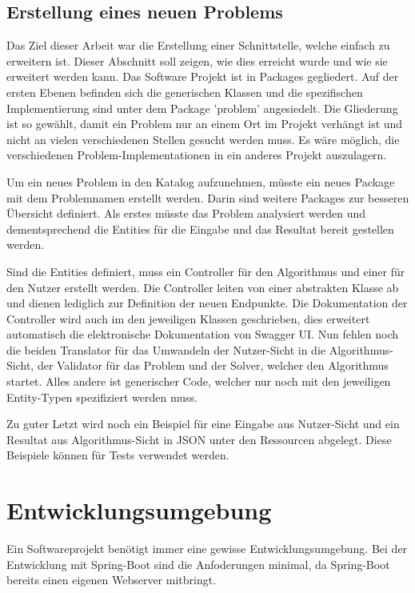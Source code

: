 \FloatBarrier

\subsection{Erstellung eines neuen Problems}
Das Ziel dieser Arbeit war die Erstellung einer Schnittstelle, welche einfach zu erweitern ist. Dieser Abschnitt soll zeigen, wie dies erreicht wurde und wie sie erweitert werden kann. Das 
Software Projekt ist in Packages gegliedert. Auf der ersten Ebenen befinden sich die generischen Klassen und die spezifischen Implementierung sind unter dem Package 'problem'  angesiedelt. 
Die Gliederung ist so gewählt, damit ein Problem nur an einem Ort im Projekt verhängt ist und nicht an vielen verschiedenen Stellen gesucht werden muss. Es wäre möglich, 
die verschiedenen Problem-Implementationen in ein anderes Projekt auszulagern.

Um ein neues Problem in den Katalog aufzunehmen, 
müsste ein neues Package mit dem Problemnamen erstellt werden. Darin sind weitere Packages zur besseren Übersicht definiert. Als erstes müsste das Problem analysiert werden und 
dementsprechend die Entities für die Eingabe und das Resultat bereit gestellen werden.

Sind die Entities definiert, muss ein Controller für den Algorithmus und einer für den Nutzer erstellt werden. Die Controller leiten von einer abstrakten Klasse ab und dienen lediglich zur Definition
der neuen Endpunkte. Die Dokumentation der Controller wird auch im den jeweiligen Klassen geschrieben, dies erweitert automatisch die elektronische Dokumentation von Swagger UI. 
Nun fehlen noch die beiden Translator für das Umwandeln der Nutzer-Sicht in die Algorithmus-Sicht, der Validator für das Problem und der Solver, welcher den Algorithmus 
startet. Alles andere ist generischer Code, welcher nur noch mit den jeweiligen Entity-Typen spezifiziert werden muss.

Zu guter Letzt wird noch ein Beispiel für eine Eingabe aus Nutzer-Sicht und ein Resultat aus Algorithmus-Sicht in JSON unter den Ressourcen abgelegt. Diese Beispiele können für Tests 
verwendet werden.

\newpage

\section{Entwicklungsumgebung}\label{entwicklungsumgebung}
Ein Softwareprojekt benötigt immer eine gewisse Entwicklungsumgebung. Bei der Entwicklung mit Spring-Boot sind die Anfoderungen minimal, da Spring-Boot bereits einen eigenen Webserver 
mitbringt.

